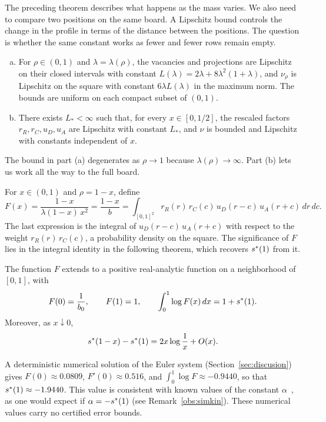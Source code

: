 The preceding theorem describes what happens as the mass varies. We also need to compare two positions on the same board. A Lipschitz
bound controls the change in the profile in terms of the distance between the positions. The question is whether the same constant
works as fewer and fewer rows remain empty.

\begin{teorema}\label{thm:lipschitz_intro} \begin{enumerate}[(a)] \item For $\rho\in(0,1)$ and
$\lambda=\lambda(\rho)$, the vacancies and projections are Lipschitz on their closed intervals with constant
$L(\lambda)=2\lambda+8\lambda^2(1+\lambda)$, and $\nu_\rho$ is Lipschitz on the square with constant $6\lambda L(\lambda)$ in the
maximum norm. The bounds are uniform on each compact subset of $(0,1)$. \item There exists $L_*<\infty$ such that, for every
$x\in[0,1/2]$, the rescaled factors $r_R,r_C,u_D,u_A$ are Lipschitz with constant $L_*$, and $\nu$ is bounded and Lipschitz with
constants independent of $x$. \end{enumerate} \end{teorema}

The bound in part (a) degenerates as $\rho\to1$ because $\lambda(\rho)\to\infty$. Part (b) lets us work all the way to the full board.

For $x\in(0,1)$ and $\rho=1-x$, define \begin{equation}\label{eq:F}
 F(x)=\frac{1-x}{\lambda(1-x)\,x^2}=\frac{1-x}{b}=\int_{[0,1]^2}r_R(r)\,r_C(c)\,u_D(r-c)\,u_A(r+c)\,dr\,dc .
\end{equation} The last expression is the integral of $u_D(r-c)\,u_A(r+c)$ with respect to the weight $r_R(r)\,r_C(c)$, a probability
density on the square. The significance of $F$ lies in the integral identity in the following theorem, which recovers $s^{*}(1)$ from
it.

\begin{teorema}\label{thm:F_intro} The function $F$ extends to a positive real-analytic
function on a neighborhood of $[0,1]$, with \[
 F(0)=\frac1{b_0},\qquad F(1)=1,\qquad \int_0^1\log F(x)\,dx=1+s^{*}(1).
\] Moreover, as $x\downarrow0$, \[
 s^{*}(1-x)-s^{*}(1)=2x\log\frac1x+O(x).
\] \end{teorema}

\begin{observacion} A deterministic numerical solution of the Euler system (Section~\ref{sec:discusion}) gives
$F(0)\approx0.0809$, $F'(0)\approx0.516$, and $\int_0^1\log F\approx-0.9440$, so that $s^{*}(1)\approx-1.9440$. This value is
consistent with known values of the constant $\alpha$~\cite{Simkin,NAB}, as one would expect if $\alpha=-s^{*}(1)$ (see
Remark~\ref{obs:simkin}). These numerical values carry no certified error bounds. \end{observacion}


